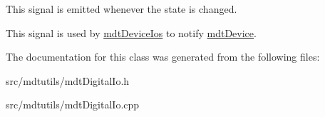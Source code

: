 This signal is emitted whenever the state is changed. 

This signal is used by \hyperlink{classmdt_device_ios}{mdtDeviceIos} to notify \hyperlink{classmdt_device}{mdtDevice}. 

The documentation for this class was generated from the following files:\begin{DoxyCompactItemize}
\item 
src/mdtutils/mdtDigitalIo.h\item 
src/mdtutils/mdtDigitalIo.cpp\end{DoxyCompactItemize}
